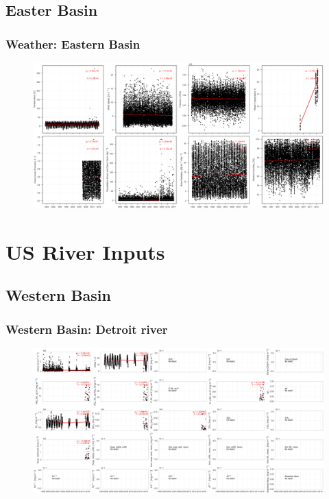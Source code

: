\documentclass{beamer}
\begin{document}
\subsection{Easter Basin}
\label{sub:wes}

\begin{frame}
\frametitle{Weather: Eastern Basin}

\begin{figure}
\includegraphics[width=\textwidth]{weather/eastern basin weather.png}
\end{figure}

\end{frame}

\section{US River Inputs}
\label{sec:river_inputs}

\subsection{Western Basin}
\label{sub:western_basin}

\begin{frame}
\frametitle{Western Basin: Detroit river}

\begin{figure}
\includegraphics[width=\textwidth]{rivers/Western basin/detroitriver.png}
\end{figure}

\end{frame}
\end{document}
